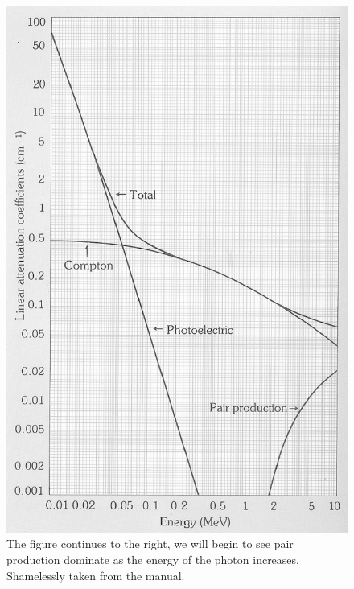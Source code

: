 \documentclass{article}
\begin{document}
	\begin{figure}[!htb]
		\centering
		\includegraphics[scale=.25]{linear_attenuation_coefficient_al}
		\caption{The figure continues to the right, we will begin to see pair production dominate as 
		the energy of the photon increases.  Shamelessly taken from the manual. \cite{lab manual}}
	\end{figure}
\end{document}

